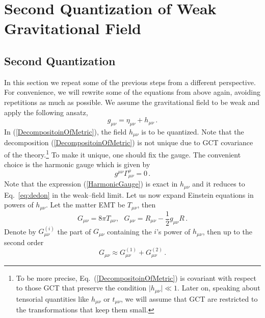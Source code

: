 \documentclass[11pt,a4paper]{article}
\newcommand{\be}{\begin{equation}}
\newcommand{\ee}{\end{equation}}
\newcommand\m{\mu}
\newcommand\n{\nu}
\renewcommand\l{\lambda}
\def\d{\partial}
\begin{document}
\section{Second Quantization of Weak Gravitational Field}
\label{sec:quant}

\subsection{Second Quantization}


In this section we repeat some of the previous steps from a different perspective.
For convenience, we will rewrite some of the equations from above again, avoiding repetitions as much as possible.
We assume the gravitational field to be weak and apply the following ansatz,
\begin{equation}\label{DecompositoinOfMetric}
g_{\mu\nu}=\eta_{\mu\nu}+h_{\mu\nu} \,.
\end{equation}
In (\ref{DecompositoinOfMetric}), the field $h_{\mu\nu}$ is to be quantized. Note that the decomposition (\ref{DecompositoinOfMetric}) is not unique due to GCT covariance of the theory.\footnote{To be more precise, Eq.~(\ref{DecompositoinOfMetric}) is covariant with respect to those GCT that preserve the condition $\vert h_{\mu\nu}\vert\ll 1$. Later on, speaking about tensorial quantities like $h_{\mu\nu}$ or $t_{\mu\nu}$, we will
assume that GCT are restricted to the transformations that keep them small.}
To make it unique, one should fix the gauge. The convenient choice is the harmonic gauge which is given by
\begin{equation}\label{HarmonicGauge}
g^{\mu\nu}\Gamma^\rho_{\mu\nu}=0\,.
\end{equation}
Note that the expression (\ref{HarmonicGauge}) is exact in $h_{\mu\nu}$ and
it reduces to Eq.~\eqref{eq:dedon}
in the weak--field limit.
Let us now expand Einstein equations in powers of $h_{\mu\nu}$. Let the matter EMT be $T_{\mu\nu}$, then
\begin{equation}\label{EinsteinEq}
G_{\mu\nu}=8\pi T_{\mu\nu},~~~ G_{\mu\nu}=R_{\mu\nu}-\dfrac{1}{2}g_{\mu\nu}R \,.
\end{equation}
Denote by $G^{(i)}_{\mu\nu}$ the part of $G_{\mu\nu}$ containing the $i$'s power of $h_{\mu\nu}$, then up to the second order
\begin{equation}\label{ExpansionOfG}
G_{\mu\nu}\approx G^{(1)}_{\mu\nu}+G^{(2)}_{\mu\nu} \,.
\end{equation}
\end{document}
